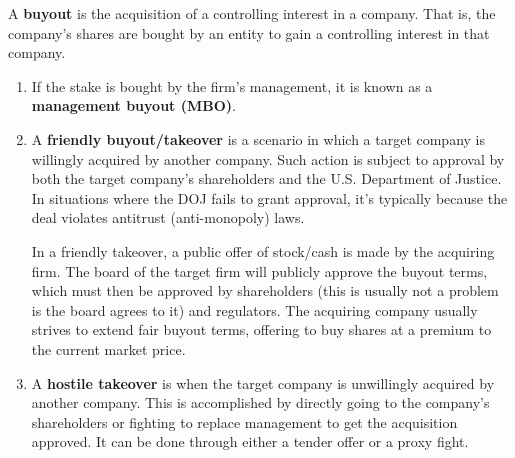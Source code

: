 \documentclass{article}
\begin{document}
    \begin{definition}[Buyout]
      A \textbf{buyout} is the acquisition of a controlling interest in a company. That is, the company's shares are bought by an entity to gain a controlling interest in that company.  
      \begin{enumerate}
        \item If the stake is bought by the firm's management, it is known as a \textbf{management buyout (MBO)}.

        \item A \textbf{friendly buyout/takeover} is a scenario in which a target company is willingly acquired by another company. Such action is subject to approval by both the target company's shareholders and the U.S. Department of Justice. In situations where the DOJ fails to grant approval, it's typically because the deal violates antitrust (anti-monopoly) laws. 
        
        In a friendly takeover, a public offer of stock/cash is made by the acquiring firm. The board of the target firm will publicly approve the buyout terms, which must then be approved by shareholders (this is usually not a problem is the board agrees to it) and regulators. The acquiring company usually strives to extend fair buyout terms, offering to buy shares at a premium to the current market price.

        \item A \textbf{hostile takeover} is when the target company is unwillingly acquired by another company. This is accomplished by directly going to the company's shareholders or fighting to replace management to get the acquisition approved. It can be done through either a tender offer or a proxy fight. 
      \end{enumerate}
    \end{definition}
\end{document}
